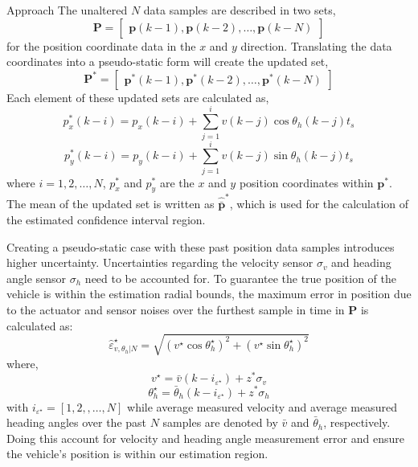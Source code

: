 \begin{section}{Approach}
The unaltered $N$ data samples are described in two sets,
\begin{equation}
    \bm{P}=\begin{bmatrix} \bm{p}(k-1) ,\bm{p}(k-2),\dots,\bm{p}(k-N) \end{bmatrix} 
\end{equation}
for the position coordinate data in the $x$ and $y$ direction. Translating the data coordinates into a pseudo-static form will create the updated set,
\begin{equation}
    \bm{P}^*=\begin{bmatrix} \bm{p}^*(k-1) ,\bm{p}^*(k-2),\dots,\bm{p}^*(k-N) \end{bmatrix} \nonumber
\end{equation}
Each element of these updated sets are calculated as,
    \begin{equation}
	p_x^*(k-i) = p_x(k-i)+\sum_{j=1}^i v(k-j)\cos{\theta_h(k-j)t_s}
	\end{equation}
	\begin{equation}
	p_y^*(k-i) = p_y(k-i)+\sum_{j=1}^i v(k-j)\sin{\theta_h(k-j)t_s}
	\end{equation}
where $i=1,2,\dots,N$, $p_x^*$ and $p_y^*$ are the $x$ and $y$ position coordinates within $\bm{p}^*$. The mean of the updated set is written as $\hat{\bar{\bm{p}}}^*$, which is used for the calculation of the estimated confidence interval region.

Creating a pseudo-static case with these past position data samples introduces higher uncertainty. Uncertainties regarding the velocity sensor $\sigma_v$ and heading angle sensor $\sigma_h$ need to be accounted for. To guarantee the true position of the vehicle is within the estimation radial bounds, the maximum error in position due to the actuator and sensor noises over the furthest sample in time in $\bm{P}$ is calculated as:
    \begin{equation}
	\hat{\varepsilon}_{v,\theta_h|N}^{\star}=\sqrt{(v^{\star}\cos{\theta_h^{\star}})^2+(v^{\star}\sin{\theta_h^{\star}})^2}
	\end{equation}
where,
    \begin{equation}
	v^{\star}=\bar{v}(k-i_{\varepsilon^{\star}})+z^{*}\sigma_v \nonumber
	\end{equation}
	\begin{equation}
	\theta_h^{\star}=\bar{\theta}_h(k-i_{\varepsilon^{\star}})+z^{*}\sigma_h \nonumber
	\end{equation}
with $i_{\varepsilon^{\star}}=[1,2,,\dots,N]$ while average measured velocity and average measured heading angles over the past $N$ samples are denoted by $\bar{v}$ and $\bar{\theta}_h$, respectively. Doing this account for velocity and heading angle measurement error and ensure the vehicle's position is within our estimation region.



\end{section}
